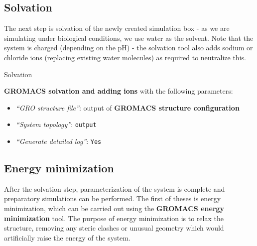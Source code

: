 \documentclass[twocolumn]{bmcart}%
\providecommand{\tightlist}{%
  \setlength{\itemsep}{0pt}\setlength{\parskip}{0pt}}
\begin{document}
\subsection*{Solvation}\label{solvation}
The next step is solvation of the newly created simulation box - as we are simulating under biological conditions, we use water as the solvent. Note
that the system is charged (depending on the pH) - the solvation tool
also adds sodium or chloride ions (replacing existing water molecules) as required to neutralize this.

\begin{handson_box_colour}{Solvation}


  \textbf{GROMACS solvation and adding ions} with the following
  parameters:
  \begin{itemize}
  \tightlist
  \item
    \emph{``GRO structure file''}: output of
    \textbf{GROMACS structure configuration}
  \item
    \emph{``System topology''}: \texttt{output}
  \item
    \emph{``Generate detailed log''}: \texttt{Yes}
  \end{itemize}

\end{handson_box_colour}

\subsection*{Energy minimization}\label{energy-minimization}

After the solvation step, parameterization of the system is complete and preparatory simulations can be performed. The first of theses is energy minimization, which can be carried out using the
\textbf{GROMACS energy minimization} tool. The purpose of energy minimization is to relax the structure, removing any steric clashes or unusual geometry which would artificially raise the energy of the system.
\end{document}
